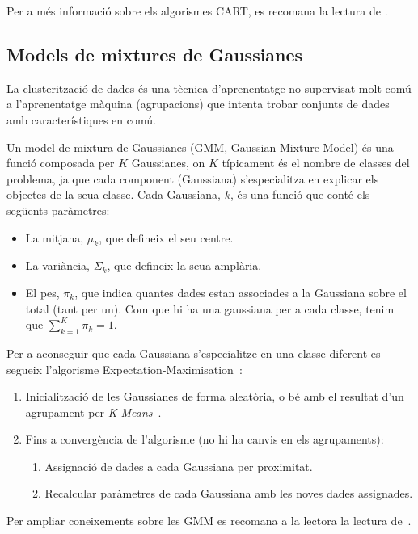 Per a més informació sobre els algorismes CART, es recomana la lectura de \cite[cap. 18.1]{pml1Book}.

\subsection{Models de mixtures de Gaussianes}
\label{cap02_mixtures}
La clusterització de dades és una tècnica d'aprenentatge no supervisat molt comú a l'aprenentatge màquina (agrupacions) que intenta trobar conjunts de dades amb característiques en comú.

Un model de mixtura de Gaussianes (GMM, Gaussian Mixture Model) és una funció composada per $K$ Gaussianes, on $K$ típicament és el nombre de classes del problema, ja que cada component (Gaussiana) s'especialitza en explicar els objectes de la seua classe. Cada Gaussiana, $k$, és una funció que conté els següents paràmetres:

\begin{itemize}
    \item La mitjana, $\mu_k$, que defineix el seu centre.
    \item La variància, $\Sigma_k$, que defineix la seua amplària.
    \item El pes, $\pi_k$, que indica quantes dades estan associades a la Gaussiana sobre el total (tant per un). Com que hi ha una gaussiana per a cada classe, tenim que $\sum_{k=1}^K \pi_k = 1$.
\end{itemize}

Per a aconseguir que cada Gaussiana s'especialitze en una classe diferent es segueix l'algorisme Expectation-Maximisation~\cite{10.2307/2984875}:

\begin{enumerate}
    \item Inicialització de les Gaussianes de forma aleatòria, o bé amb el resultat d'un agrupament per \textit{K-Means}~\cite{JAIN2010651}.
    \item Fins a convergència de l'algorisme (no hi ha canvis en els agrupaments):
        \begin{enumerate}[label=(\arabic*)]
            \item Assignació de dades a cada Gaussiana per proximitat.
            \item Recalcular paràmetres de cada Gaussiana amb les noves dades assignades.
        \end{enumerate}
\end{enumerate}

Per ampliar coneixements sobre les GMM es recomana a la lectora la lectura de~\cite[Capítol 2.5]{jurafskySLP}.

